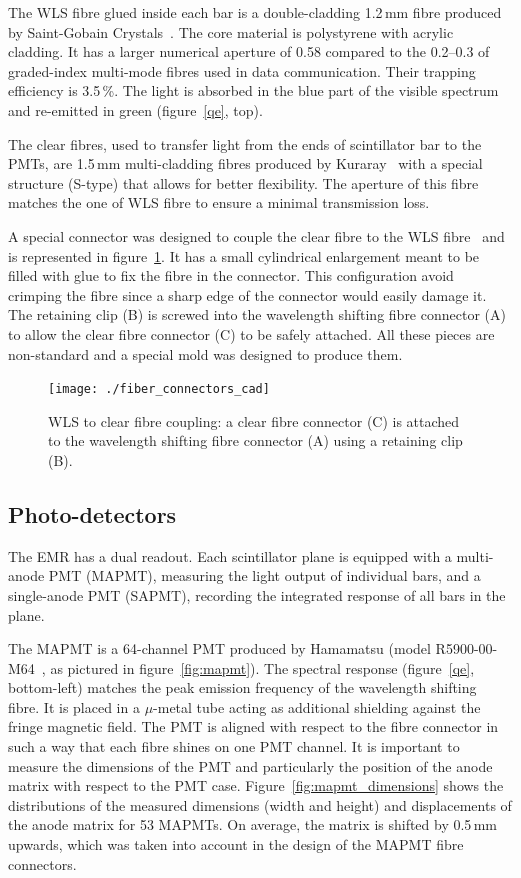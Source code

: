 \documentclass[a4paper,11pt]{article}
\begin{document}
The WLS fibre glued inside each bar is a double-cladding 1.2\,mm fibre produced by Saint-Gobain Crystals~\cite{saintgobain}.
The core material is polystyrene with acrylic cladding. It has a larger numerical aperture of 0.58 compared to the 0.2--0.3
of graded-index multi-mode fibres used in data communication. Their trapping efficiency is 3.5\,\%. The light is absorbed in the blue part of
the visible spectrum and re-emitted in green (figure~\ref{qe}, top). 

The clear fibres, used to transfer light from the ends of scintillator bar to the PMTs, are 1.5\,mm multi-cladding fibres produced by 
Kuraray~\cite{kuraray} with a special structure (S-type) that allows for better flexibility. The aperture of this fibre matches
the one of WLS fibre to ensure a minimal transmission loss.

A special connector was designed to couple the clear fibre to the WLS fibre~\cite{emr_design_change} and is represented in 
figure~\ref{fig:fibre_connectors_cad}. It has a small cylindrical enlargement meant to be filled with glue to fix the fibre in the connector.
This configuration avoid crimping the fibre since a sharp edge of the connector would easily damage it. The retaining clip (B) is screwed into
the wavelength shifting fibre connector (A) to allow the clear fibre connector (C) to be safely attached. All these pieces are non-standard and
a special mold was designed to produce them. 

\begin{figure}[htp!]
 \centering
 \texttt{[image: ./fiber\_connectors\_cad]}
 \caption[Clear fibre connector]{WLS to clear fibre coupling: a clear fibre connector (C) is attached to the wavelength shifting fibre connector
 (A) using a retaining clip (B).}
 \label{fig:fibre_connectors_cad}
\end{figure}

\subsection{Photo-detectors}
The EMR has a dual readout. Each scintillator plane is equipped with a multi-anode PMT (MAPMT), measuring
the light output of individual bars, and a single-anode PMT (SAPMT), recording the integrated response of all bars in the plane. 

The MAPMT is a 64-channel PMT produced by Hamamatsu (model R5900-00-M64~\cite{hamamatsu_mapmt}, as pictured in figure~\ref{fig:mapmt}). The spectral
response (figure~\ref{qe}, bottom-left) matches the peak emission frequency of the wavelength shifting fibre. It is placed in a $\mu$-metal tube acting
as additional shielding against the fringe magnetic field. The PMT is aligned with respect to the fibre connector in such a way that each fibre shines
on one PMT channel. It is important to measure the dimensions of the PMT and particularly the position of the anode matrix with respect to the
PMT case. Figure~\ref{fig:mapmt_dimensions} shows the distributions of the measured dimensions (width and height) and displacements of the anode
matrix for 53 MAPMTs. On average, the matrix is shifted by 0.5\,mm upwards, which was taken into account in the design of the MAPMT fibre connectors.
\end{document}
